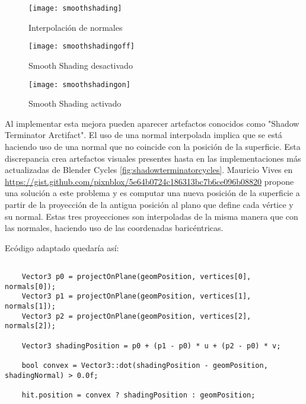 \begin{figure}[H]
    \centering
	\texttt{[image: smoothshading]}
	\caption{Interpolación de normales}
	\label{fig:smoothshading}
\end{figure}

\begin{figure}[H]
		\centering
		\begin{minipage}[b]{0.4\textwidth}
		\texttt{[image: smoothshadingoff]}
		\caption{Smooth Shading desactivado}
		\label{fig:smoothshadingoff}
	  \end{minipage}
	  \hfill
	  \begin{minipage}[b]{0.4\textwidth}
		\texttt{[image: smoothshadingon]}
		\caption{Smooth Shading activado}
		\label{fig:smoothshadingon}
	  \end{minipage}
	  	\hfill
\end{figure}


Al implementar esta mejora pueden aparecer artefactos conocidos como "Shadow Terminator Arctifact". El uso de una normal interpolada implica que se está haciendo uso de una normal que no coincide con la posición de la superficie. Esta discrepancia crea artefactos visuales presentes hasta en las implementaciones más actualizadas de Blender Cycles \autoref{fig:shadowterminatorcycles}. Mauricio Vives en \url{https://gist.github.com/pixnblox/5e64b0724c186313bc7b6ce096b08820} propone una solución a este problema y es computar una nueva posición de la superficie a partir de la proyección de la antigua posición al plano que define cada vértice y su normal. Estas tres proyecciones son interpoladas de la misma manera que con las normales, haciendo uso de las coordenadas baricéntricas.
	
Ecódigo adaptado quedaría así:
	
\begin{lstlisting}
	
	Vector3 p0 = projectOnPlane(geomPosition, vertices[0], normals[0]);
    Vector3 p1 = projectOnPlane(geomPosition, vertices[1], normals[1]);
    Vector3 p2 = projectOnPlane(geomPosition, vertices[2], normals[2]);

    Vector3 shadingPosition = p0 + (p1 - p0) * u + (p2 - p0) * v;

    bool convex = Vector3::dot(shadingPosition - geomPosition, shadingNormal) > 0.0f;
	
	hit.position = convex ? shadingPosition : geomPosition;
	
\end{lstlisting}

